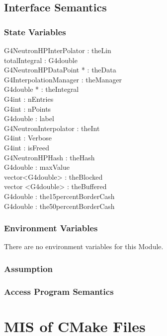 \documentclass[12pt]{article}
\begin{document}
\subsection{Interface Semantics}

\subsubsection{State Variables}%
G4NeutronHPInterPolator : theLin\\
totalIntegral : G4double\\
G4NeutronHPDataPoint * : theData\\
G4InterpolationManager : theManager\\
G4double * : theIntegral\\
G4int : nEntries\\
G4int : nPoints\\
G4double : label\\
G4NeutronInterpolator : theInt\\
G4int : Verbose\\
G4int : isFreed\\
G4NeutronHPHash : theHash\\
G4double : maxValue\\
vector<G4double> : theBlocked\\
vector <G4double> : theBuffered\\
G4double : the15percentBorderCash\\
G4double : the50percentBorderCash


\subsubsection{Environment Variables}%
There are no environment variables for this Module.

\subsubsection{Assumption}%

\subsubsection{Access Program Semantics}%

\section{MIS of CMake Files}
\end{document}
